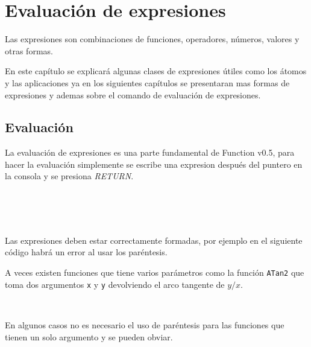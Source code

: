 
\chapter{Evaluación de expresiones}
   Las expresiones son combinaciones de funciones, operadores, números, valores y otras formas.

   En este capítulo se explicará algunas clases de expresiones útiles como los átomos y las aplicaciones ya en los siguientes capítulos se presentaran mas formas de expresiones y ademas sobre el comando de evaluación de expresiones.

   \section{Evaluación}
      La evaluación de expresiones es una parte fundamental de Function v0.5, para hacer la evaluación simplemente se escribe una expresion después del puntero en la consola y se presiona {\it RETURN}.
      
      \begin{fxcode}
          \\
         \\
          \\
      \end{fxcode}
      
      Las expresiones deben estar correctamente formadas, por ejemplo en el siguiente código habrá un error al usar los paréntesis.
      
      \begin{fxcode}
          
      \end{fxcode}
      
      A veces existen funciones que tiene varios parámetros como la función \texttt{ATan2} que toma dos argumentos \texttt{x} y \texttt{y} devolviendo el arco tangente de $y/x$.
      
      \begin{fxcode}
         \\
      \end{fxcode}
      
      En algunos casos no es necesario el uso de paréntesis para las funciones que tienen un solo argumento y se pueden obviar.
      
